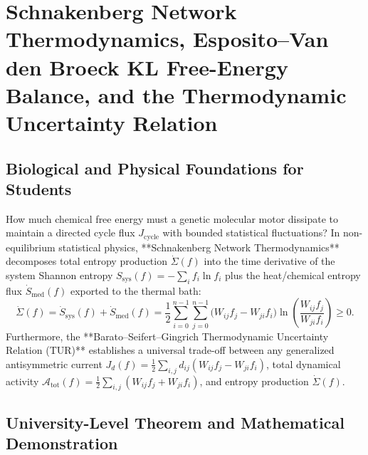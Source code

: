 \documentclass[11pt,a4paper]{article}
\theoremstyle{definition}
\theoremstyle{remark}
\begin{document}
\section{Schnakenberg Network Thermodynamics, Esposito--Van den Broeck KL Free-Energy Balance, and the Thermodynamic Uncertainty Relation}

\subsection{Biological and Physical Foundations for Students}
How much chemical free energy must a genetic molecular motor dissipate to maintain a directed cycle flux $J_{\mathrm{cycle}}$ with bounded statistical fluctuations? In non-equilibrium statistical physics, **Schnakenberg Network Thermodynamics** decomposes total entropy production $\dot{\Sigma}(f)$ into the time derivative of the system Shannon entropy $S_{\mathrm{sys}}(f) = -\sum_i f_i \ln f_i$ plus the heat/chemical entropy flux $\dot{S}_{\mathrm{med}}(f)$ exported to the thermal bath:
\begin{equation}
  \dot{\Sigma}(f) = \dot{S}_{\mathrm{sys}}(f) + \dot{S}_{\mathrm{med}}(f) = \frac{1}{2}\sum_{i=0}^{n-1}\sum_{j=0}^{n-1} \bigl(W_{ij}f_j - W_{ji}f_i\bigr)\ln\!\left(\frac{W_{ij}f_j}{W_{ji}f_i}\right) \ge 0.
\end{equation}
Furthermore, the **Barato--Seifert--Gingrich Thermodynamic Uncertainty Relation (TUR)** establishes a universal trade-off between any generalized antisymmetric current $J_d(f) = \frac{1}{2}\sum_{i,j} d_{ij}(W_{ij}f_j - W_{ji}f_i)$, total dynamical activity $\mathcal{A}_{\mathrm{tot}}(f) = \frac{1}{2}\sum_{i,j} (W_{ij}f_j + W_{ji}f_i)$, and entropy production $\dot{\Sigma}(f)$.

\subsection{University-Level Theorem and Mathematical Demonstration}
\end{document}
